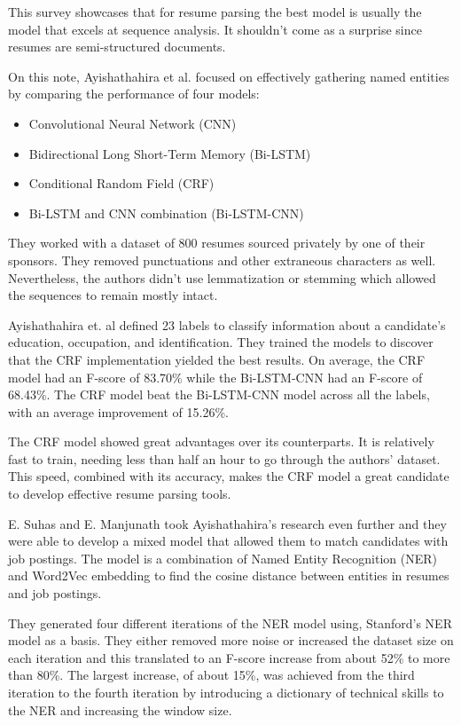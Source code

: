 \documentclass[a4paper, conference]{ieeeconf}
\begin{document}
  This survey showcases that for resume parsing the best model is usually the
  model that excels at sequence analysis. It shouldn't come as a surprise since
  resumes are semi-structured documents.

  \medskip
  On this note, Ayishathahira et al. \cite{Ayishathahira2018a} focused on
  effectively gathering named entities by comparing the performance of four
  models:
  \begin{itemize}
    \item Convolutional Neural Network (CNN)
    \item Bidirectional Long Short-Term Memory (Bi-LSTM)
    \item Conditional Random Field (CRF)
    \item Bi-LSTM and CNN combination (Bi-LSTM-CNN)
  \end{itemize}
  They worked with a dataset of 800 resumes sourced privately by one of their
  sponsors. They removed punctuations and other extraneous characters as well.
  Nevertheless, the authors didn't use lemmatization or stemming which allowed
  the sequences to remain mostly intact.

  Ayishathahira et. al defined 23 labels to classify information about a
  candidate's education, occupation, and identification. They trained the
  models to discover that the CRF implementation yielded the best results. On
  average, the CRF model had an F-score of 83.70\% while the Bi-LSTM-CNN had an
  F-score of 68.43\%. The CRF model beat the Bi-LSTM-CNN model across all the
  labels, with an average improvement of 15.26\%.

  The CRF model showed great advantages over its counterparts. It is relatively
  fast to train, needing less than half an hour to go through the authors'
  dataset. This speed, combined with its accuracy, makes the CRF model a great
  candidate to develop effective resume parsing tools.

  \medskip
  E. Suhas and E. Manjunath \cite{E*2020} took Ayishathahira's
  \cite{Ayishathahira2018a} research even further and they were able to develop
  a mixed model that allowed them to match candidates with job postings. The
  model is a combination of Named Entity Recognition (NER) and Word2Vec
  embedding to find the cosine distance between entities in resumes and job
  postings.

  They generated four different iterations of the NER model using, Stanford's
  NER model as a basis. They either removed more noise or increased the dataset
  size on each iteration and this translated to an F-score increase from about
  52\% to more than 80\%. The largest increase, of about 15\%, was achieved
  from the third iteration to the fourth iteration by introducing a dictionary
  of technical skills to the NER and increasing the window size.
\end{document}
